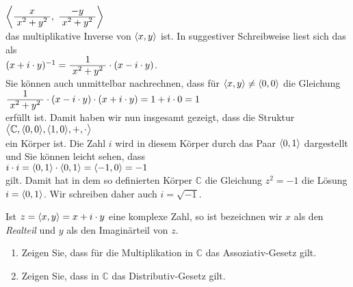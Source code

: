 $\left\langle \bruch{x}{x^2 + y^2},\; \bruch{-y}{x^2 + y^2}\right\rangle$
\\[0.2cm]
das multiplikative Inverse von $\pair(x,y)$ ist.  In suggestiver Schreibweise liest sich das als
\\[0.2cm]
\hspace*{1.3cm}
$(x + i \cdot y)^{-1} = \bruch{1}{x^2 + y^2} \cdot (x  - i \cdot y)$.
\\[0.2cm]
Sie können auch unmittelbar nachrechnen, dass für $\pair(x,y) \not= \pair(0,0)$ die Gleichung
\\[0.2cm]
\hspace*{1.3cm}
$\bruch{1}{x^2 + y^2} \cdot (x  - i \cdot y) \cdot (x + i \cdot y) = 1 + i \cdot 0 = 1$ 
\\[0.2cm]
erfüllt ist.  Damit haben wir nun insgesamt gezeigt, dass die Struktur
\\[0.2cm]
\hspace*{1.3cm}
$\bigl\langle \mathbb{C}, \pair(0,0), \pair(1,0), +, \cdot \bigr\rangle$ 
\\[0.2cm]
ein Körper ist.  Die Zahl $i$ wird in diesem Körper durch das Paar $\pair(0,1)$ dargestellt und
Sie können leicht sehen, dass
\\[0.2cm]
\hspace*{1.3cm}
$i \cdot i = \pair(0,1) \cdot \pair(0,1) = \pair(-1,0) = -1$
\\[0.2cm]
gilt.  Damit hat in dem so definierten Körper $\mathbb{C}$ die Gleichung $z^2 = -1$ die Lösung
$i = \pair(0,1)$.  Wir schreiben daher auch $i = \sqrt{-1}$.

Ist $z = \pair(x,y) = x + i \cdot y$ eine komplexe Zahl, so ist bezeichnen wir $x$ als den \emph{Realteil}
und $y$ als den Imaginärteil von $z$.

\exercise
\renewcommand{\labelenumi}{(\alph{enumi})}
\begin{enumerate}
\item Zeigen Sie, dass für die Multiplikation in $\mathbb{C}$ das Assoziativ-Gesetz gilt.
\item Zeigen Sie, dass in $\mathbb{C}$ das Distributiv-Gesetz gilt. \exend
\end{enumerate}
\renewcommand{\labelenumi}{\arabic{enumi}.}


